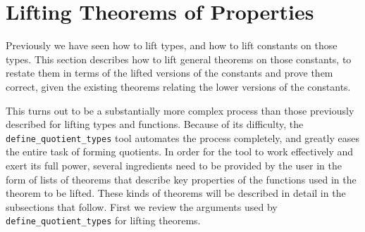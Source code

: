 \documentclass[envcountsame,runningheads]{llncs}
\begin{document}
%


%
\section{Lifting Theorems of Properties}
%
\label{liftingtheorems}

Previously we have seen how to lift types, and how to lift constants
on those types.  This section describes how to lift
general theorems
on those constants,
to restate them in terms of the lifted versions of
the constants and prove them correct,
given the existing theorems relating the lower versions of the constants.

This turns out to be a substantially more complex process than
those previously described for lifting types and functions. 
Because of its difficulty, the {\tt define\_quotient\_types} tool
automates the process completely,
and greatly eases the entire task of forming quotients.
In order for the tool to work effectively and
exert its full power, several ingredients need to be provided
by the user in the form of lists of theorems that describe
key properties of the functions used
in the theorem to be lifted.  These kinds of theorems will be
described in detail in the subsections that follow.
First we
review the arguments used by
{\tt define\_quotient\_types}
for lifting theorems.
\end{document}
